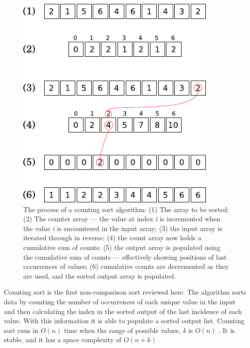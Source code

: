 \documentclass[12pt, a4paper]{article}
\begin{document}
\begin{figure}
    \centering
    \includegraphics{counting.pdf}
    \caption{\label{fig:counting}The process of a counting sort algorithm: (1) The array to be sorted; (2) The counter array — the value at index \emph{i} is incremented when the value \emph{i} is encountered in the input array; (3) the input array is iterated through in reverse; (4) the count array now holds a cumulative sum of counts; (5) the output array is populated using the cumulative sum of counts — effectively showing positions of last occurrences of values; (6) cumulative counts are decremented as they are used, and the sorted output array is populated.}
\end{figure}

Counting sort is the first non-comparison sort reviewed here. The algorithm sorts data by counting the number of occurrences of each unique value in the input and then calculating the index in the sorted output of the last incidence of each value. With this information it is able to populate a sorted output list. Counting sort runs in $O(n)$ time when the range of possible values, \emph{k} is $O(n)$ \autocite[168]{cormen01}. It is stable, and it has a space complexity of $O(n + k)$ \autocite{woltmann20:counting}.
\end{document}
